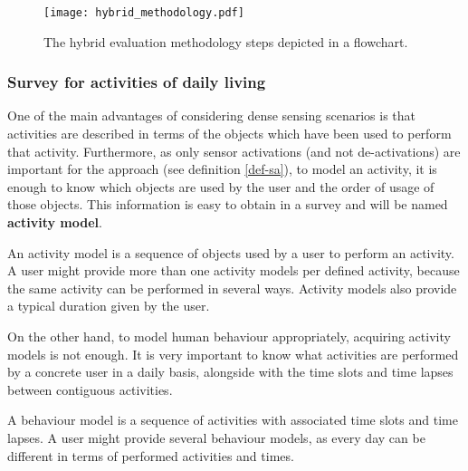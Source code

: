 \begin{figure}[htbp]
\centering
\texttt{[image: hybrid\_methodology.pdf]}
    \caption{The hybrid evaluation methodology steps depicted in a flowchart.}
    \label{fig-methodology}
\end{figure}

\subsubsection{Survey for activities of daily living}
\label{subsubsec:evaluation:survey}
\begin{comment}
 - Explain each of the questions of the survey
 - Show a screenshot and provide the link to the Google Form
 - Google Forms guarantee users' anonymity
 - Explain survey-script translation criteria
\end{comment}

One of the main advantages of considering dense sensing scenarios is that activities are described in terms of the objects which have been used to perform that activity. Furthermore, as only sensor activations (and not de-activations) are important for the approach (see definition \ref{def-sa}), to model an activity, it is enough to know which objects are used by the user and the order of usage of those objects. This information is easy to obtain in a survey and will be named \textbf{activity model}.

\begin{defn}
\label{def-act-model}
 An activity model is a sequence of objects used by a user to perform an activity. A user might provide more than one activity models per defined activity, because the same activity can be performed in several ways. Activity models also provide a typical duration given by the user.
\end{defn}

On the other hand, to model human behaviour appropriately, acquiring activity models is not enough. It is very important to know what activities are performed by a concrete user in a daily basis, alongside with the time slots and time lapses between contiguous activities. 

\begin{defn}
\label{def-behaviour}
 A behaviour model is a sequence of activities with associated time slots and time lapses. A user might provide several behaviour models, as every day can be different in terms of performed activities and times.
\end{defn}

